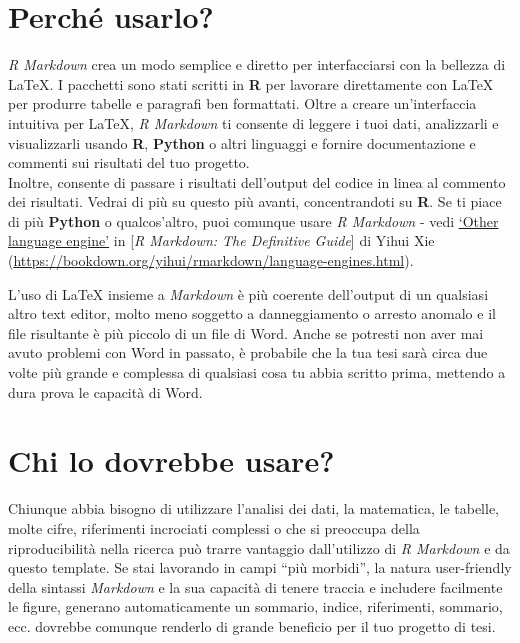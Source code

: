 \documentclass[a4paper, 11pt, nobind]{templates/ociamthesis}
\begin{document}
\hypertarget{perchuxe9-usarlo}{%
\section*{Perché usarlo?}\label{perchuxe9-usarlo}}

\emph{R Markdown} crea un modo semplice e diretto per interfacciarsi con la bellezza di LaTeX.
I pacchetti sono stati scritti in \textbf{R} per lavorare direttamente con LaTeX per produrre tabelle e paragrafi ben formattati.
Oltre a creare un'interfaccia intuitiva per LaTeX, \emph{R Markdown} ti consente di leggere i tuoi dati, analizzarli e visualizzarli usando \textbf{R}, \textbf{Python} o altri linguaggi e fornire documentazione e commenti sui risultati del tuo progetto.\\
Inoltre, consente di passare i risultati dell'output del codice in linea al commento dei risultati.
Vedrai di più su questo più avanti, concentrandoti su \textbf{R}.
Se ti piace di più \textbf{Python} o qualcos'altro, puoi comunque usare \emph{R Markdown} - vedi \href{https://bookdown.org/yihui/rmarkdown/language-engines.html}{`Other language engine'} in {[}\emph{R Markdown: The Definitive Guide}{]} di Yihui Xie (\url{https://bookdown.org/yihui/rmarkdown/language-engines.html}).

L'uso di LaTeX insieme a \emph{Markdown} è più coerente dell'output di un qualsiasi altro text editor, molto meno soggetto a danneggiamento o arresto anomalo e il file risultante è più piccolo di un file di Word.
Anche se potresti non aver mai avuto problemi con Word in passato, è probabile che la tua tesi sarà circa due volte più grande e complessa di qualsiasi cosa tu abbia scritto prima, mettendo a dura prova le capacità di Word.

\hypertarget{chi-lo-dovrebbe-usare}{%
\section*{Chi lo dovrebbe usare?}\label{chi-lo-dovrebbe-usare}}

Chiunque abbia bisogno di utilizzare l'analisi dei dati, la matematica, le tabelle, molte cifre, riferimenti incrociati complessi o che si preoccupa della riproducibilità nella ricerca può trarre vantaggio dall'utilizzo di \emph{R Markdown} e da questo template.
Se stai lavorando in campi ``più morbidi'', la natura user-friendly della sintassi \emph{Markdown} e la sua capacità di tenere traccia e includere facilmente le figure, generano automaticamente un sommario, indice, riferimenti, sommario, ecc. dovrebbe comunque renderlo di grande beneficio per il tuo progetto di tesi.
\end{document}
